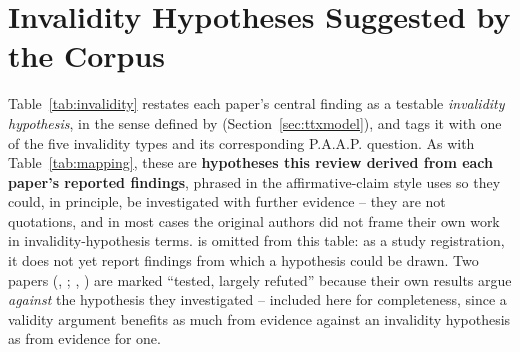 \documentclass[11pt]{article}
\begin{document}
\section{Invalidity Hypotheses Suggested by the Corpus}
\label{sec:invalidity}

Table~\ref{tab:invalidity} restates each paper's central finding as a testable \emph{invalidity hypothesis}, in the sense defined by \citet{araneda2023dissertation} (Section~\ref{sec:ttxmodel}), and tags it with one of the five invalidity types and its corresponding P.A.A.P. question. As with Table~\ref{tab:mapping}, these are \textbf{hypotheses this review derived from each paper's reported findings}, phrased in the affirmative-claim style \citeauthor{araneda2023dissertation} uses so they could, in principle, be investigated with further evidence -- they are not quotations, and in most cases the original authors did not frame their own work in invalidity-hypothesis terms. \citet{kaleta2025studentperspectives} is omitted from this table: as a study registration, it does not yet report findings from which a hypothesis could be drawn. Two papers (\citeauthor{dang2024vstep}, \citeyear{dang2024vstep}; \citeauthor{nakatsuhara2021videoconferencing}, \citeyear{nakatsuhara2021videoconferencing}) are marked ``tested, largely refuted'' because their own results argue \emph{against} the hypothesis they investigated -- included here for completeness, since a validity argument benefits as much from evidence against an invalidity hypothesis as from evidence for one.
\end{document}
